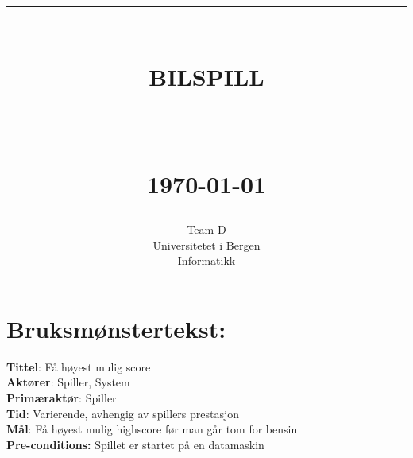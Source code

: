 \documentclass[12pt]{report}
\newcommand{\HRule}[1]{\rule{\linewidth}{#1}}
\begin{document}
\title{ \normalsize \textsc{}
		\\ [2.0cm]
		\HRule{0.5pt} \\
		\LARGE \textbf{\uppercase{Bilspill}}
		\HRule{2pt} \\ [0.5cm]
		\normalsize \today \vspace*{5\baselineskip}}
\date{}
\author{
		Team D  \\ 
		Universitetet i Bergen \\
		Informatikk }
\maketitle
\tableofcontents
\newpage
\sectionfont{\scshape}
\section*{Bruksmønstertekst:}
\textbf{Tittel}: Få høyest mulig score
\bigskip \\
\textbf{Akt{\o}rer}: Spiller, System
\bigskip \\
\textbf{Prim{\ae}rakt{\o}r}: Spiller
\bigskip \\
\textbf{Tid}: Varierende, avhengig av spillers prestasjon
\bigskip \\
\textbf{M{\aa}l}: Få høyest mulig highscore før man går tom for bensin
\bigskip \\
\textbf{Pre-conditions:} Spillet er startet på en datamaskin
\end{document}
